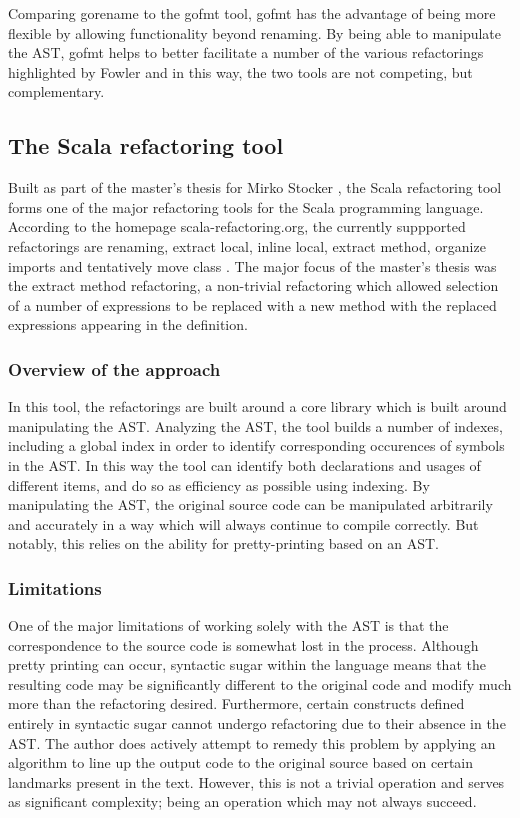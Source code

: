 Comparing gorename to the gofmt tool, gofmt has the advantage of being more flexible by allowing functionality beyond renaming. By being able to manipulate the AST, gofmt helps to better facilitate a number of the various refactorings highlighted by Fowler and in this way, the two tools are not competing, but complementary.

\subsection{The Scala refactoring tool}
Built as part of the master's thesis for Mirko Stocker \cite{stocker2010scala}, the Scala refactoring tool forms one of the major refactoring tools for the Scala programming language. According to the homepage scala-refactoring.org, the currently suppported refactorings are renaming, extract local, inline local, extract method, organize imports and tentatively move class \cite{scala15}. The major focus of the master's thesis was the extract method refactoring, a non-trivial refactoring which allowed selection of a number of expressions to be replaced with a new method with the replaced expressions appearing in the definition.

\subsubsection{Overview of the approach}
In this tool, the refactorings are built around a core library which is built around manipulating the AST. Analyzing the AST, the tool builds a number of indexes, including a global index in order to identify corresponding occurences of symbols in the AST. In this way the tool can identify both declarations and usages of different items, and do so as efficiency as possible using indexing. By manipulating the AST, the original source code can be manipulated arbitrarily and accurately in a way which will always continue to compile correctly. But notably, this relies on the ability for pretty-printing based on an AST.

\subsubsection{Limitations}
One of the major limitations of working solely with the AST is that the correspondence to the source code is somewhat lost in the process. Although pretty printing can occur, syntactic sugar within the language means that the resulting code may be significantly different to the original code and modify much more than the refactoring desired. Furthermore, certain constructs defined entirely in syntactic sugar cannot undergo refactoring due to their absence in the AST. The author does actively attempt to remedy this problem by applying an algorithm to line up the output code to the original source based on certain landmarks present in the text. However, this is not a trivial operation and serves as significant complexity; being an operation which may not always succeed.

